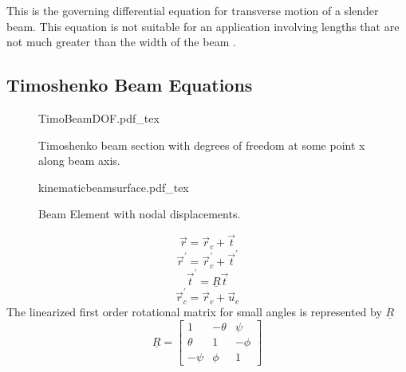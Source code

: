 This is the governing differential equation for transverse motion of a slender beam. This equation is not suitable for an application involving lengths that are not much greater than the width of the beam \cite{genta2007dynamics}.


\subsection{Timoshenko Beam Equations}
\begin{figure}
	\centering
	\def\svgwidth{300pt}
	{TimoBeamDOF.pdf_tex}
	\caption{Timoshenko beam section with degrees of freedom at some point x along beam axis.}
	\label{fig:TimoBeamDOF}
\end{figure}

\begin{figure}
	\centering
	\def\svgwidth{400pt}
	{kinematicbeamsurface.pdf_tex}
	\caption{Beam Element with nodal displacements.}
	\label{fig:KineBeamElem}
\end{figure}
\begin{equation}\label{eq:r}
\vec{r}=\vec{r}_c+\vec{t}
\end{equation}
\begin{equation}\label{eq:rprime}
\vec{r}^\prime=\vec{r}_c^\prime+\vec{t}^\prime
\end{equation}
\begin{equation}\label{eq:trot}
\vec{t}^\prime=\underline{R}\vec{t}
\end{equation}
\begin{equation}\label{eq:rtrans}
\vec{r}_c^\prime=\vec{r}_c+\vec{u}_c
\end{equation}
The linearized first order rotational matrix for small angles is represented by $\underline{R}$
\begin{equation}\label{eq:RotTransformation}
\underline{R}=\left[\begin{array}{ccc}
1&-\theta&\psi\\
\theta&1&-\phi\\
-\psi&\phi&1
\end{array}\right]
\end{equation}
